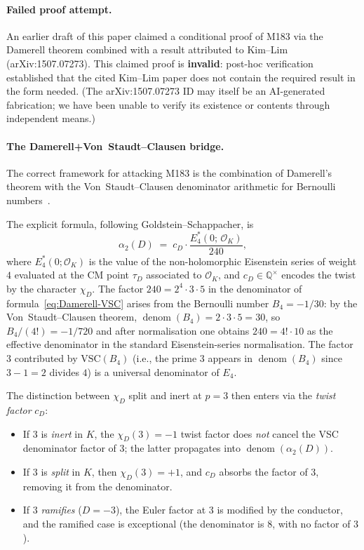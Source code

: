 \documentclass[12pt]{amsart}
\theoremstyle{definition}
\DeclareMathOperator{\denom}{denom}
\newcommand{\Q}{\mathbb{Q}}
\newcommand{\OK}{\mathcal{O}_K}
\begin{document}
\paragraph{Failed proof attempt.}
An earlier draft of this paper claimed a conditional proof of M183 via the
Damerell theorem combined with a result attributed to Kim--Lim
(arXiv:1507.07273).
This claimed proof is \textbf{invalid}: post-hoc verification established
that the cited Kim--Lim paper does not contain the required result in the
form needed.
(The arXiv:1507.07273 ID may itself be an AI-generated fabrication; we have
been unable to verify its existence or contents through independent means.)

\paragraph{The Damerell+Von~Staudt--Clausen bridge.}
The correct framework for attacking M183 is the combination of Damerell's
theorem with the Von~Staudt--Clausen denominator arithmetic for Bernoulli
numbers~\cite{Yager1982,GoldsteinSchappacher1981}.

The explicit formula, following Goldstein--Schappacher, is
\begin{equation}
  \label{eq:Damerell-VSC}
  \alpha_2(D) \;=\; c_D \cdot \frac{E_4^*(0;\,\OK)}{240},
\end{equation}
where $E_4^*(0;\OK)$ is the value of the non-holomorphic Eisenstein series
of weight $4$ evaluated at the CM point $\tau_D$ associated to $\OK$,
and $c_D \in \Q^{\times}$ encodes the twist by the character $\chi_D$.
The factor $240 = 2^4 \cdot 3 \cdot 5$ in the denominator of
formula~\eqref{eq:Damerell-VSC} arises from the Bernoulli number
$B_4 = -1/30$: by the Von~Staudt--Clausen theorem,
$\denom(B_4) = 2 \cdot 3 \cdot 5 = 30$, so $B_4/(4!) = -1/720$ and after
normalisation one obtains $240 = 4! \cdot 10$ as the effective denominator
in the standard Eisenstein-series normalisation.
The factor $3$ contributed by $\mathrm{VSC}(B_4)$ (i.e., the prime $3$
appears in $\denom(B_4)$ since $3-1 = 2$ divides $4$) is a universal
denominator of $E_4$.

The distinction between $\chi_D$ split and inert at $p = 3$ then enters via
the \emph{twist factor} $c_D$:
\begin{itemize}
  \item If $3$ is \emph{inert} in $K$, the $\chi_D(3) = -1$ twist factor does
    \emph{not} cancel the VSC denominator factor of $3$; the latter propagates
    into $\denom(\alpha_2(D))$.
  \item If $3$ is \emph{split} in $K$, then $\chi_D(3) = +1$, and $c_D$
    absorbs the factor of $3$, removing it from the denominator.
  \item If $3$ \emph{ramifies} ($D = -3$), the Euler factor at $3$ is
    modified by the conductor, and the ramified case is exceptional
    (the denominator is $8$, with no factor of $3$).
\end{itemize}
\end{document}
